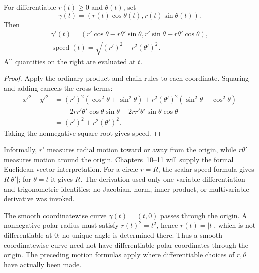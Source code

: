 \begin{proposition}\label{prop:elementary-polar-motion}
For differentiable $r(t)\geq0$ and $\theta(t)$, set
\[
\gamma(t)=(r(t)\cos\theta(t),r(t)\sin\theta(t)).
\]
Then
\[
\begin{aligned}
\gamma'(t)=(r'\cos\theta-r\theta'\sin\theta,
             r'\sin\theta+r\theta'\cos\theta),\\
\operatorname{speed}(t)=\sqrt{(r')^2+r^2(\theta')^2}.
\end{aligned}
\]
All quantities on the right are evaluated at $t$.
\end{proposition}
\begin{proof}
Apply the ordinary product and chain rules to each coordinate. Squaring
and adding cancels the cross terms:
\[
\begin{aligned}
x'^2+y'^2
&=(r')^2(\cos^2\theta+\sin^2\theta)
  +r^2(\theta')^2(\sin^2\theta+\cos^2\theta)\\
&\quad-2rr'\theta'\cos\theta\sin\theta
       +2rr'\theta'\sin\theta\cos\theta\\
&=(r')^2+r^2(\theta')^2.
\end{aligned}
\]
Taking the nonnegative square root gives speed.
\end{proof}
Informally, $r'$ measures radial motion toward or away from the origin,
while $r\theta'$ measures motion around the origin. Chapters~10--11 will
supply the formal Euclidean vector interpretation. For a circle $r=R$,
the scalar speed formula gives $R|\theta'|$; for $\theta=t$ it gives $R$.
The derivation used only one-variable differentiation and trigonometric
identities: no Jacobian, norm, inner product, or multivariable derivative was
invoked.

\begin{remark}
The smooth coordinatewise curve $\gamma(t)=(t,0)$ passes through the origin.
A nonnegative polar radius must satisfy $r(t)^2=t^2$, hence
$r(t)=|t|$, which is not differentiable at $0$; no unique angle is
determined there. Thus a smooth coordinatewise curve
need not have differentiable polar coordinates through the origin.
The preceding motion formulas apply where differentiable choices of
$r,\theta$ have actually been made.
\end{remark}

